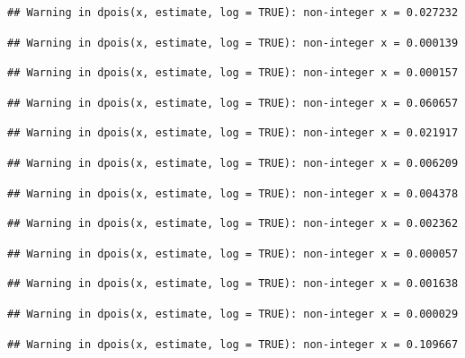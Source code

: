 \documentclass[]{article}
\begin{document}
\begin{verbatim}
## Warning in dpois(x, estimate, log = TRUE): non-integer x = 0.027232
\end{verbatim}

\begin{verbatim}
## Warning in dpois(x, estimate, log = TRUE): non-integer x = 0.000139
\end{verbatim}

\begin{verbatim}
## Warning in dpois(x, estimate, log = TRUE): non-integer x = 0.000157
\end{verbatim}

\begin{verbatim}
## Warning in dpois(x, estimate, log = TRUE): non-integer x = 0.060657
\end{verbatim}

\begin{verbatim}
## Warning in dpois(x, estimate, log = TRUE): non-integer x = 0.021917
\end{verbatim}

\begin{verbatim}
## Warning in dpois(x, estimate, log = TRUE): non-integer x = 0.006209
\end{verbatim}

\begin{verbatim}
## Warning in dpois(x, estimate, log = TRUE): non-integer x = 0.004378
\end{verbatim}

\begin{verbatim}
## Warning in dpois(x, estimate, log = TRUE): non-integer x = 0.002362
\end{verbatim}

\begin{verbatim}
## Warning in dpois(x, estimate, log = TRUE): non-integer x = 0.000057
\end{verbatim}

\begin{verbatim}
## Warning in dpois(x, estimate, log = TRUE): non-integer x = 0.001638
\end{verbatim}

\begin{verbatim}
## Warning in dpois(x, estimate, log = TRUE): non-integer x = 0.000029
\end{verbatim}

\begin{verbatim}
## Warning in dpois(x, estimate, log = TRUE): non-integer x = 0.109667
\end{verbatim}
\end{document}
